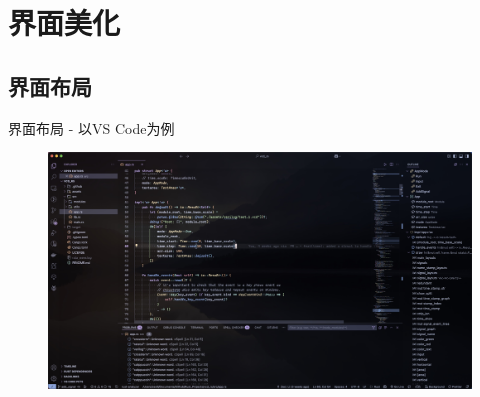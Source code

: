 \documentclass[aspectratio=169]{ctexbeamer}
\begin{document}
\section{界面美化}

  \subsection{界面布局}
    \begin{frame}{界面布局 - 以VS Code为例}
      \begin{figure}[H]
        \centering
        \includegraphics[width=0.75\linewidth]{./Figures/Vscode_interface.jpg}
      \end{figure}
    \end{frame}
\end{document}
